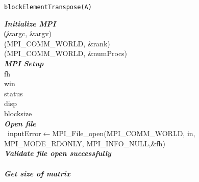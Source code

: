 \documentclass[11pt,conference]{IEEEtran}
\begin{document}
\newpage
\begin{algorithm}[h]



\caption{\texttt{blockElementTranspose(A)}}

\emph{\textbf{Initialize MPI}}\\
\c(\&argc, \&argv)\\
\d(MPI\_COMM\_WORLD, \&rank) \\
\e (MPI\_COMM\_WORLD, \&numProcs) \\

\emph{\textbf{MPI Setup}}\\
\file fh \\
\win win \\
\status status \\
\disp disp\\
\disp blocksize \\
\vspace{0.5cm}
\emph{\textbf{Open file}}\\
\ inputError$\leftarrow$MPI\_File\_open(MPI\_COMM\_WORLD, in, MPI\_MODE\_RDONLY, MPI\_INFO\_NULL,\&fh)
\vspace{0.5cm} \\ 
\emph{\textbf{Validate file open successfully}} \\
\vspace{0.5cm} \\
\emph{\textbf{Get size of matrix}}\\


\end{algorithm}
\end{document}
